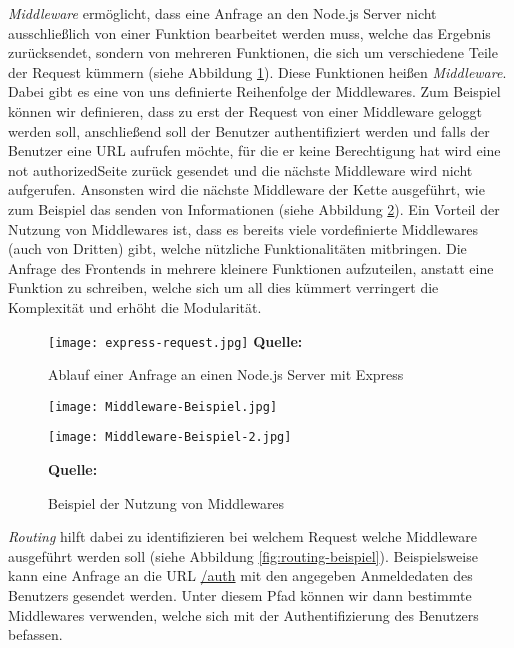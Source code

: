 \textit{Middleware} ermöglicht, dass eine Anfrage an den Node.js Server nicht ausschließlich von einer Funktion bearbeitet werden muss, welche das Ergebnis zurücksendet, sondern von mehreren Funktionen, die sich um verschiedene Teile der Request kümmern (siehe Abbildung \ref{fig:express-request}). Diese Funktionen heißen \textit{Middleware}. Dabei gibt es eine von uns definierte Reihenfolge der Middlewares. Zum Beispiel können wir definieren, dass zu erst der Request von einer Middleware geloggt werden soll, anschließend soll der Benutzer authentifiziert werden und falls der Benutzer eine URL aufrufen möchte, für die er keine Berechtigung hat wird eine \glqq not authorized\grqq{ }Seite zurück gesendet und die nächste Middleware wird nicht aufgerufen. Ansonsten wird die nächste Middleware der Kette ausgeführt, wie zum Beispiel das senden von Informationen (siehe Abbildung \ref{fig:middleware-beispiel}). Ein Vorteil der Nutzung von Middlewares ist, dass es bereits viele vordefinierte Middlewares (auch von Dritten) gibt, welche nützliche Funktionalitäten mitbringen. Die Anfrage des Frontends in mehrere kleinere Funktionen aufzuteilen, anstatt eine Funktion zu schreiben, welche sich um all dies kümmert verringert die Komplexität und erhöht die Modularität.

  \begin{figure}[h]
  \centering
  \texttt{[image: express-request.jpg]}
\raggedleft
    \footnotesize\sffamily\textbf{Quelle:} \cite{expressbook}
  \caption{Ablauf einer Anfrage an einen Node.js Server mit Express}
  \label{fig:express-request}
\end{figure}



  \begin{figure}[h!]
  \centering
  \texttt{[image: Middleware-Beispiel.jpg]}
  
  \vspace{10mm}
  
  \texttt{[image: Middleware-Beispiel-2.jpg]}
  
\raggedleft
    \footnotesize\sffamily\textbf{Quelle:} \cite{expressbook}
  \caption{Beispiel der Nutzung von Middlewares}
  \label{fig:middleware-beispiel}
\end{figure}

\textit{Routing} hilft dabei zu identifizieren bei welchem Request welche Middleware ausgeführt werden soll (siehe Abbildung \ref{fig:routing-beispiel}). Beispielsweise kann eine Anfrage an die URL \url{/auth} mit den angegeben Anmeldedaten des Benutzers gesendet werden. Unter diesem Pfad können wir dann bestimmte Middlewares verwenden, welche sich mit der Authentifizierung des Benutzers befassen.

